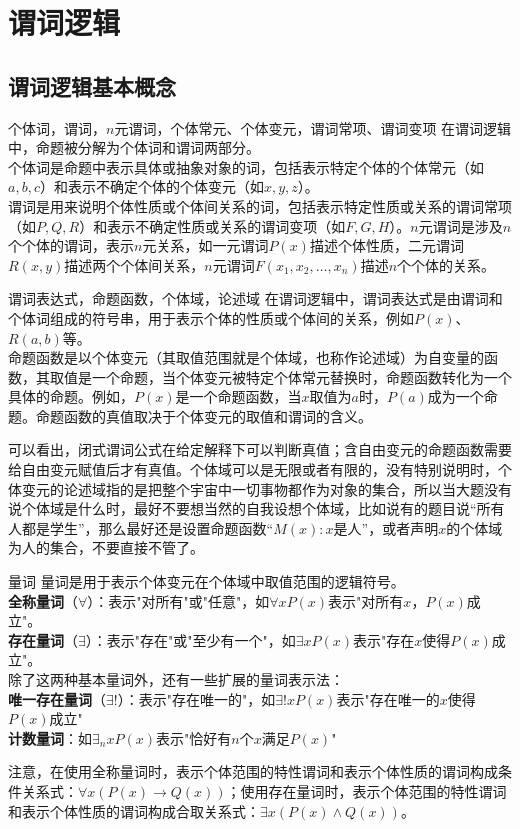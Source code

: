 \documentclass[lang=cn,11pt]{elegantbook}
\begin{document}
\chapter{谓词逻辑}
\section{谓词逻辑基本概念}
\begin{definition}{个体词，谓词，$n$元谓词，个体常元、个体变元，谓词常项、谓词变项}
在谓词逻辑中，命题被分解为个体词和谓词两部分。\\
个体词是命题中表示具体或抽象对象的词，包括表示特定个体的个体常元（如$a, b, c$）和表示不确定个体的个体变元（如$x, y, z$）。\\
谓词是用来说明个体性质或个体间关系的词，包括表示特定性质或关系的谓词常项（如$P, Q, R$）和表示不确定性质或关系的谓词变项（如$F, G, H$）。$n$元谓词是涉及$n$个个体的谓词，表示$n$元关系，如一元谓词$P(x)$描述个体性质，二元谓词$R(x,y)$描述两个个体间关系，$n$元谓词$F(x_1,x_2,\ldots,x_n)$描述$n$个个体的关系。
\end{definition}
\begin{definition}{谓词表达式，命题函数，个体域，论述域}
在谓词逻辑中，谓词表达式是由谓词和个体词组成的符号串，用于表示个体的性质或个体间的关系，例如$P(x)$、$R(a, b)$等。\\
命题函数是以个体变元（其取值范围就是个体域，也称作论述域）为自变量的函数，其取值是一个命题，当个体变元被特定个体常元替换时，命题函数转化为一个具体的命题。例如，$P(x)$是一个命题函数，当$x$取值为$a$时，$P(a)$成为一个命题。命题函数的真值取决于个体变元的取值和谓词的含义。
\end{definition}
可以看出，闭式谓词公式在给定解释下可以判断真值；含自由变元的命题函数需要给自由变元赋值后才有真值。个体域可以是无限或者有限的，没有特别说明时，个体变元的论述域指的是把整个宇宙中一切事物都作为对象的集合，所以当大题没有说个体域是什么时，最好不要想当然的自我设想个体域，比如说有的题目说“所有人都是学生”，那么最好还是设置命题函数“$M(x):x$是人”，或者声明$x$的个体域为人的集合，不要直接不管了。
\begin{definition}{量词}
量词是用于表示个体变元在个体域中取值范围的逻辑符号。\\
\textbf{全称量词}（$\forall$）：表示"对所有"或"任意"，如$\forall x P(x)$表示"对所有$x$，$P(x)$成立"。\\
\textbf{存在量词}（$\exists$）：表示"存在"或"至少有一个"，如$\exists x P(x)$表示"存在$x$使得$P(x)$成立"。\\
除了这两种基本量词外，还有一些扩展的量词表示法：\\
\textbf{唯一存在量词}（$\exists!$）：表示"存在唯一的"，如$\exists! x P(x)$表示"存在唯一的$x$使得$P(x)$成立"\\
\textbf{计数量词}：如$\exists_n x P(x)$表示"恰好有$n$个$x$满足$P(x)$"
\end{definition}
注意，在使用全称量词时，表示个体范围的特性谓词和表示个体性质的谓词构成条件关系式：$\forall x (P(x) \rightarrow Q(x))$；使用存在量词时，表示个体范围的特性谓词和表示个体性质的谓词构成合取关系式：$\exists x (P(x) \land Q(x))$。
\end{document}
